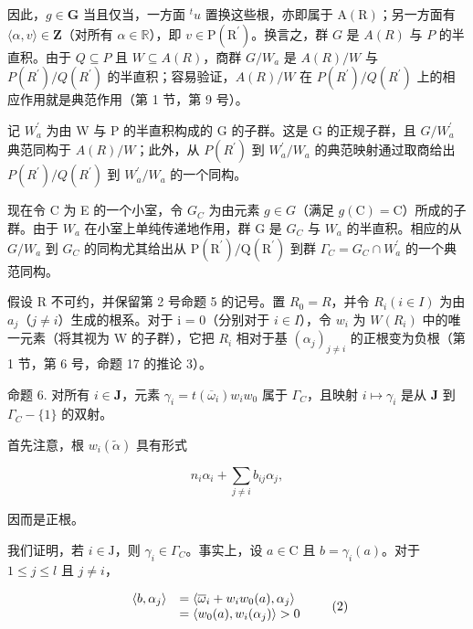 因此，\(g \in \mathbf{G}\) 当且仅当，一方面 \({}^t u\) 置换这些根，亦即属于 \(\mathrm{A(R)}\)；另一方面有 \(\langle \alpha, v \rangle \in \mathbf{Z}\)（对所有 \(\alpha \in \mathbb{R}\)），即 \(v \in \mathrm{P(R^{\prime})}\)。换言之，群 \(G\) 是 \(A(R)\) 与 \(P\) 的半直积。由于 \(Q \subseteq P\) 且 \(W \subseteq A(R)\)，商群 \(G / W_a\) 是 \(A(R)/W\) 与 \(P(R^{\prime})/Q(R^{\prime})\) 的半直积；容易验证，\(A(R)/W\) 在 \(P(R^{\prime})/Q(R^{\prime})\) 上的相应作用就是典范作用（第 1 节，第 9 号）。

记 \(W_{a}^{\prime}\) 为由 W 与 P 的半直积构成的 G 的子群。这是 G 的正规子群，且 \(G/W_{a}^{\prime}\) 典范同构于 \(A(R)/W\)；此外，从 \(P(R^{\prime})\) 到 \(W_{a}^{\prime}/W_{a}\) 的典范映射通过取商给出 \(P(R^{\prime})/Q(R^{\prime})\) 到 \(W_{a}^{\prime}/W_{a}\) 的一个同构。

现在令 C 为 E 的一个小室，令 \(G_{C}\) 为由元素 \(g \in G\)（满足 \(g(\mathrm{C}) = \mathrm{C}\)）所成的子群。由于 \(W_{a}\) 在小室上单纯传递地作用，群 G 是 \(G_{C}\) 与 \(W_{a}\) 的半直积。相应的从 \(G/W_{a}\) 到 \(G_{C}\) 的同构尤其给出从 \(\mathrm{P}(\mathrm{R}^{\prime})/\mathrm{Q}(\mathrm{R}^{\prime})\) 到群 \(\Gamma_{C} = G_{C} \cap W_{a}^{\prime}\) 的一个典范同构。

假设 R 不可约，并保留第 2 号命题 5 的记号。置 \(R_{0} = R\)，并令 \(R_{i} (i \in I)\) 为由 \(a_{j}\)（\(j \neq i\)）生成的根系。对于 i = 0（分别对于 \(i \in I\)），令 \(w_{i}\) 为 \(W(R_{i})\) 中的唯一元素（将其视为 W 的子群），它把 \(R_{i}\) 相对于基 \((\alpha_{j})_{j \neq i}\) 的正根变为负根（第 1 节，第 6 号，命题 17 的推论 3）。

命题 6. 对所有 \(i \in \mathbf{J}\)，元素 \(\gamma_i = t(\overline{\omega}_i)w_i w_0\) 属于 \(\Gamma_{C}\)，且映射 \(i \mapsto \gamma_i\) 是从 \(\mathbf{J}\) 到 \(\Gamma_{C} - \{1\}\) 的双射。

首先注意，根 \(w_{i}(\tilde{\alpha})\) 具有形式

\[
n _ {i} \alpha_ {i} + \sum_ {j \neq i} b _ {i j} \alpha_ {j},
\]

因而是正根。

我们证明，若 \(i \in \mathrm{J}\)，则 \(\gamma_i \in \Gamma_{C}\)。事实上，设 \(a \in \mathrm{C}\) 且 \(b = \gamma_i(a)\)。对于 \(1 \leqslant j \leqslant l\) 且 \(j \neq i\)，

\[
\begin{array}{r l} \langle b, \alpha_ {j} \rangle & = \langle \overline {{\omega}} _ {i} + w _ {i} w _ {0} (a), \alpha_ {j} \rangle \\ & = \langle w _ {0} (a), w _ {i} (\alpha_ {j}) \rangle > 0 \end{array}\tag{2}
\]

